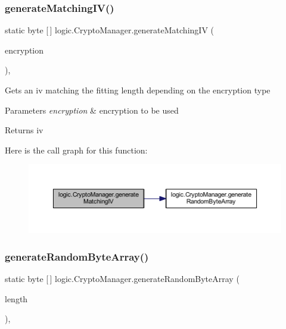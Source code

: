 \subsubsection{\texorpdfstring{generate\+Matching\+I\+V()}{generateMatchingIV()}}
{\footnotesize\ttfamily static byte \mbox{[}$\,$\mbox{]} logic.\+Crypto\+Manager.\+generate\+Matching\+IV (\begin{DoxyParamCaption}\item[{\mbox{\hyperlink{enumenums_1_1_encryption_type}{Encryption\+Type}}}]{encryption }\end{DoxyParamCaption})\hspace{0.3cm}{\ttfamily [static]}, {\ttfamily [private]}}

Gets an iv matching the fitting length depending on the encryption type 
\begin{DoxyParams}{Parameters}
{\em encryption} & encryption to be used \\
\hline
\end{DoxyParams}
\begin{DoxyReturn}{Returns}
iv 
\end{DoxyReturn}
Here is the call graph for this function\+:\nopagebreak
\begin{figure}[H]
\begin{center}
\leavevmode
\includegraphics[width=350pt]{classlogic_1_1_crypto_manager_ab2b0c505d44383d199f21aaa829290c4_cgraph}
\end{center}
\end{figure}
\mbox{\label{classlogic_1_1_crypto_manager_ab8b195435e4051b57895f72f4d3d1661}} 
\subsubsection{\texorpdfstring{generate\+Random\+Byte\+Array()}{generateRandomByteArray()}}
{\footnotesize\ttfamily static byte \mbox{[}$\,$\mbox{]} logic.\+Crypto\+Manager.\+generate\+Random\+Byte\+Array (\begin{DoxyParamCaption}\item[{int}]{length }\end{DoxyParamCaption})\hspace{0.3cm}{\ttfamily [static]}, {\ttfamily [private]}}


